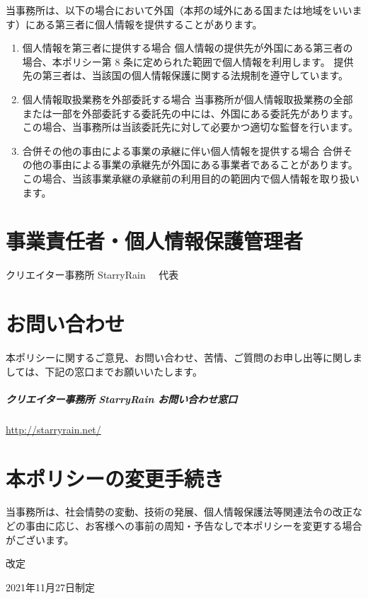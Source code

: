 \documentclass[a4j,titlepage]{ltjsarticle}
\begin{document}
当事務所は、以下の場合において外国（本邦の域外にある国または地域をいいます）にある第三者に個人情報を提供することがあります。
\begin{enumerate}[(1)]
	\item 個人情報を第三者に提供する場合
	      個人情報の提供先が外国にある第三者の場合、本ポリシー第 8 条に定められた範囲で個人情報を利用します。
	      提供先の第三者は、当該国の個人情報保護に関する法規制を遵守しています。
	\item 個人情報取扱業務を外部委託する場合
	      当事務所が個人情報取扱業務の全部または一部を外部委託する委託先の中には、外国にある委託先があります。この場合、当事務所は当該委託先に対して必要かつ適切な監督を行います。
	\item 合併その他の事由による事業の承継に伴い個人情報を提供する場合
	      合併その他の事由による事業の承継先が外国にある事業者であることがあります。この場合、当該事業承継の承継前の利用目的の範囲内で個人情報を取り扱います。
\end{enumerate}


\section{事業責任者・個人情報保護管理者}
クリエイター事務所 StarryRain 　代表

\section{お問い合わせ}
本ポリシーに関するご意見、お問い合わせ、苦情、ご質問のお申し出等に関しましては、下記の窓口までお願いいたします。
\subparagraph{クリエイター事務所 StarryRain お問い合わせ窓口}
\url{http://starryrain.net/}


\section{本ポリシーの変更手続き}
当事務所は、社会情勢の変動、技術の発展、個人情報保護法等関連法令の改正などの事由に応じ、お客様への事前の周知・予告なしで本ポリシーを変更する場合がございます。

\par \date{\Filemodtoday{\jobname}} 改定
\par 2021年11月27日制定
\end{document}
